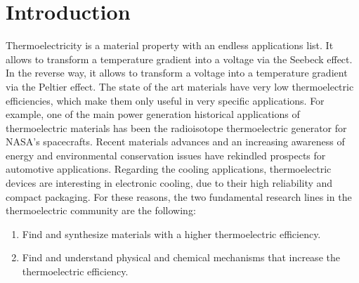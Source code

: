 
\chapter*{Introduction} %

\label{Chapter0} %


Thermoelectricity is a material property with an endless applications list. It allows to transform 
a temperature gradient into a voltage via the Seebeck effect\cite{li2009thermoelectric,yang2006thermoelectric}. In 
the reverse way, it allows to transform a voltage into a temperature gradient via the Peltier 
effect\cite{disalvo1999thermoelectric,zhao2014review}. The state of the art materials have very low thermoelectric 
efficiencies, which make them only useful in very specific applications. For example, one of the main power 
generation historical applications of thermoelectric materials has been the radioisotope thermoelectric generator 
for NASA's spacecrafts\cite{yang2006thermoelectric}. Recent materials advances and an increasing awareness of energy 
and environmental conservation issues have rekindled prospects for automotive applications. Regarding the cooling 
applications, thermoelectric devices are interesting in electronic cooling, due to their high reliability and 
compact packaging\cite{zhao2014review}. For these reasons, the two fundamental research lines in the thermoelectric 
community are the following: 
\begin{enumerate}
\item Find and synthesize materials with a higher thermoelectric efficiency.
\item Find and understand physical and chemical mechanisms that increase the thermoelectric efficiency. \\
\end{enumerate}


